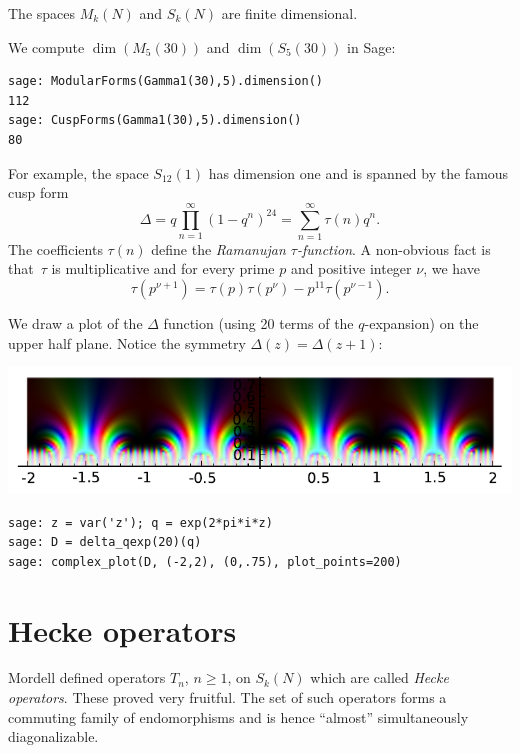 \documentclass{report}
\begin{document}
The spaces $M_k(N)$ and $S_k(N)$
are finite dimensional.
\begin{example}
We compute $\dim(M_5(30))$ and $\dim(S_5(30))$ in Sage:
\begin{lstlisting}
sage: ModularForms(Gamma1(30),5).dimension()
112
sage: CuspForms(Gamma1(30),5).dimension()
80
\end{lstlisting}
\end{example}


For example,
the space $S_{12}(1)$ has dimension one and
is spanned by the famous cusp form
\begin{equation*}
\Delta = q\prod_{n=1}^{\infty}(1-q^n)^{24} = \sum_{n=1}^{\infty} \tau(n) q^n.
\end{equation*}
The coefficients $\tau(n)$ define the
{\em Ramanujan $\tau$-function}.
A non-obvious fact is that~$\tau$ is multiplicative and for
every prime $p$ and positive integer $\nu$, we have
$$
\tau(p^{\nu+1})=\tau(p)\tau(p^{\nu})-p^{11}\tau(p^{\nu-1}).
$$

\begin{example}
We draw a plot of the $\Delta$ function (using 20 terms of the $q$-expansion) on the upper half plane.  Notice the symmetry $\Delta(z)=\Delta(z+1)$:
\begin{center}
\includegraphics[width=\textwidth]{graphics/deltaplot}
\end{center}
\begin{lstlisting}
sage: z = var('z'); q = exp(2*pi*i*z)
sage: D = delta_qexp(20)(q)
sage: complex_plot(D, (-2,2), (0,.75), plot_points=200)
\end{lstlisting}
\end{example}

\section{Hecke operators}\label{sec:hecke1}
Mordell defined
operators $T_n$, $n\geq 1$, on $S_k(N)$ which are called
{\em Hecke operators}.
These proved very fruitful. The set of such
operators forms a commuting family of endomorphisms and
is hence ``almost'' simultaneously diagonalizable.
\end{document}
